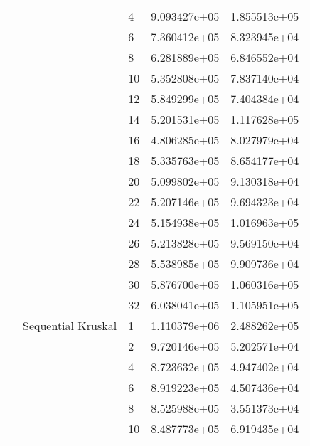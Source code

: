 \begin{tabular}{lllrr}
                      &                     & 4  &  9.093427e+05 &  1.855513e+05 \\
                      &                     & 6  &  7.360412e+05 &  8.323945e+04 \\
                      &                     & 8  &  6.281889e+05 &  6.846552e+04 \\
                      &                     & 10 &  5.352808e+05 &  7.837140e+04 \\
                      &                     & 12 &  5.849299e+05 &  7.404384e+04 \\
                      &                     & 14 &  5.201531e+05 &  1.117628e+05 \\
                      &                     & 16 &  4.806285e+05 &  8.027979e+04 \\
                      &                     & 18 &  5.335763e+05 &  8.654177e+04 \\
                      &                     & 20 &  5.099802e+05 &  9.130318e+04 \\
                      &                     & 22 &  5.207146e+05 &  9.694323e+04 \\
                      &                     & 24 &  5.154938e+05 &  1.016963e+05 \\
                      &                     & 26 &  5.213828e+05 &  9.569150e+04 \\
                      &                     & 28 &  5.538985e+05 &  9.909736e+04 \\
                      &                     & 30 &  5.876700e+05 &  1.060316e+05 \\
                      &                     & 32 &  6.038041e+05 &  1.105951e+05 \\
                      & Sequential Kruskal & 1  &  1.110379e+06 &  2.488262e+05 \\
                      &                     & 2  &  9.720146e+05 &  5.202571e+04 \\
                      &                     & 4  &  8.723632e+05 &  4.947402e+04 \\
                      &                     & 6  &  8.919223e+05 &  4.507436e+04 \\
                      &                     & 8  &  8.525988e+05 &  3.551373e+04 \\
                      &                     & 10 &  8.487773e+05 &  6.919435e+04 \\

\end{tabular}
